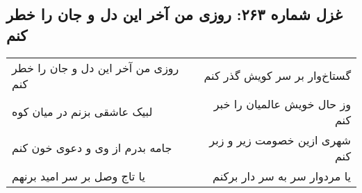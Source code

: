 \begin{center}
\section*{غزل شماره ۲۶۳: روزی من آخر این دل و جان را خطر کنم}
\label{sec:263}
\begin{longtable}{l p{0.5cm} r}
روزی من آخر این دل و جان را خطر کنم
&&
گستاخ‌وار بر سر کویش گذر کنم
\\
لبیک عاشقی بزنم در میان کوه
&&
وز حال خویش عالمیان را خبر کنم
\\
جامه بدرم از وی و دعوی خون کنم
&&
شهری ازین خصومت زیر و زبر کنم
\\
یا تاج وصل بر سر امید برنهم
&&
یا مردوار سر به سر دار برکنم
\\
\end{longtable}
\end{center}
